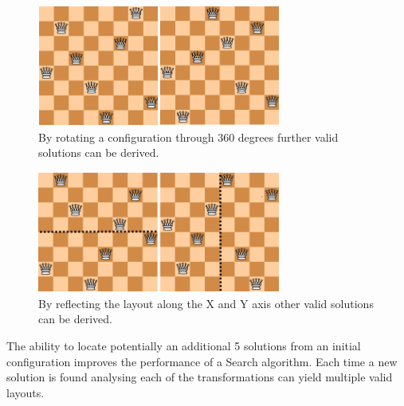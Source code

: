 \documentclass[conference]{IEEEtran}
\begin{document}
\begin{figure}[!htbp]
	\centering	
	\includegraphics[width=8cm, height=4cm]{NQueensRotation2}
	\caption{By rotating a configuration through 360 degrees further valid solutions can be derived.}
\end{figure}

\begin{figure}[!htbp]
	\centering	
	\includegraphics[width=8cm, height=4cm]{Valid8QueensReflected}
	\caption{By reflecting the layout along the X and Y axis other valid solutions can be derived.}
\end{figure}

The ability to locate potentially an additional 5 solutions from an initial configuration improves the performance of a Search algorithm. Each time a new solution is found analysing each of the transformations can yield multiple valid layouts.
\end{document}
